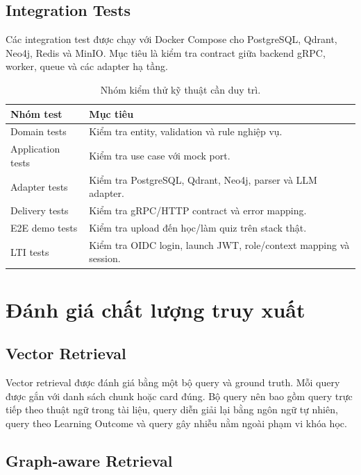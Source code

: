 \subsection{Integration Tests}

Các integration test được chạy với Docker Compose cho
PostgreSQL, Qdrant, Neo4j, Redis và MinIO. Mục tiêu là kiểm tra contract giữa
backend gRPC, worker, queue và các adapter hạ tầng.

\begin{table}[H]
    \centering
    \caption{Nhóm kiểm thử kỹ thuật cần duy trì.}
    \label{tab:test-groups-lvtn}
    \begin{tabular}{|p{4cm}|p{9.5cm}|}
        \hline
        \textbf{Nhóm test} & \textbf{Mục tiêu} \\
        \hline
        Domain tests & Kiểm tra entity, validation và rule nghiệp vụ. \\
        \hline
        Application tests & Kiểm tra use case với mock port. \\
        \hline
        Adapter tests & Kiểm tra PostgreSQL, Qdrant, Neo4j, parser và LLM adapter. \\
        \hline
        Delivery tests & Kiểm tra gRPC/HTTP contract và error mapping. \\
        \hline
        E2E demo tests & Kiểm tra upload đến học/làm quiz trên stack thật. \\
        \hline
        LTI tests & Kiểm tra OIDC login, launch JWT, role/context mapping và session. \\
        \hline
    \end{tabular}
\end{table}

\section{Đánh giá chất lượng truy xuất}

\subsection{Vector Retrieval}

Vector retrieval được đánh giá bằng một bộ query và ground truth. Mỗi query
được gắn với danh sách chunk hoặc card đúng. Bộ query nên bao gồm query trực
tiếp theo thuật ngữ trong tài liệu, query diễn giải lại bằng ngôn ngữ tự
nhiên, query theo Learning Outcome và query gây nhiễu nằm ngoài phạm vi khóa
học.

\subsection{Graph-aware Retrieval}

